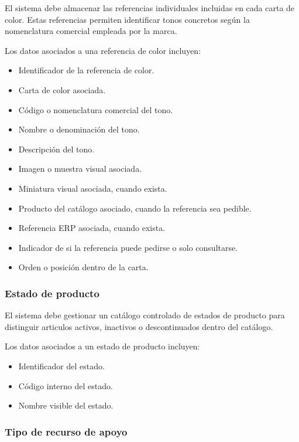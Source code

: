 El sistema debe almacenar las referencias individuales incluidas en cada carta de color. Estas referencias permiten identificar tonos concretos según la nomenclatura comercial empleada por la marca.

Los datos asociados a una referencia de color incluyen:

\begin{itemize}
    \item Identificador de la referencia de color.
    \item Carta de color asociada.
    \item Código o nomenclatura comercial del tono.
    \item Nombre o denominación del tono.
    \item Descripción del tono.
    \item Imagen o muestra visual asociada.
    \item Miniatura visual asociada, cuando exista.
    \item Producto del catálogo asociado, cuando la referencia sea pedible.
    \item Referencia ERP asociada, cuando exista.
    \item Indicador de si la referencia puede pedirse o solo consultarse.
    \item Orden o posición dentro de la carta.
\end{itemize}

\subsubsection*{Estado de producto}

El sistema debe gestionar un catálogo controlado de estados de producto para distinguir articulos activos, inactivos o descontinuados dentro del catálogo.

Los datos asociados a un estado de producto incluyen:

\begin{itemize}
    \item Identificador del estado.
    \item Código interno del estado.
    \item Nombre visible del estado.
\end{itemize}

\subsubsection*{Tipo de recurso de apoyo}

